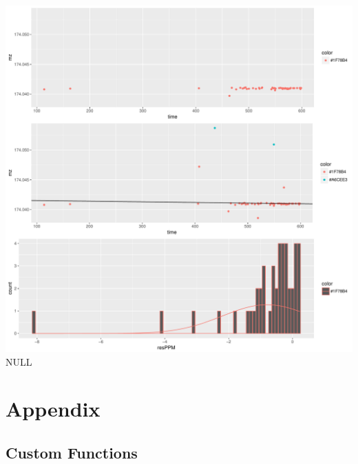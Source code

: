 \documentclass[]{article}
\begin{document}
\includegraphics{Supplementary_document_files/figure-latex/filter.lm.174-1.pdf}
NULL

\section{Appendix}\label{appendix}

\subsection{Custom Functions}\label{custom-functions}
\end{document}
